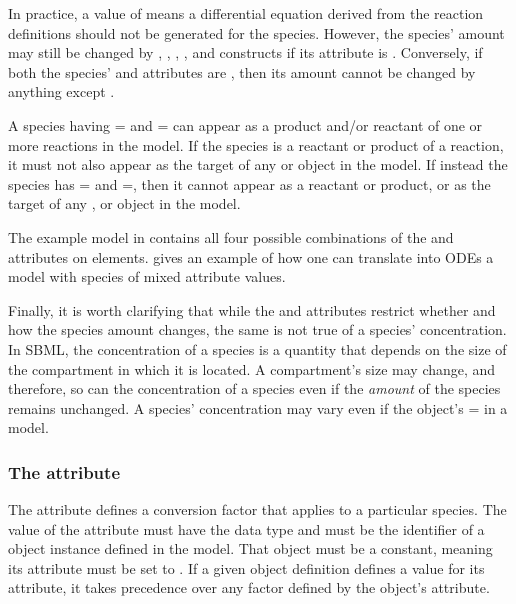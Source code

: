 In practice, a  value of  means
a differential equation derived from the reaction definitions
should not be generated for the species.  However, the species'
amount may still be changed by \AssignmentRule, \RateRule,
\AlgebraicRule, \Event, and \InitialAssignment constructs if its
 attribute is .  Conversely, if both
the species'  and 
attributes are , then its amount cannot be changed by
anything except \InitialAssignment.

A species having = and
= can appear as a product and/or
reactant of one or more reactions in the model.  If the species is
a reactant or product of a reaction, it must not also appear as
the target of any \AssignmentRule or \RateRule object in the
model.  If instead the species has
= and
=, then it cannot appear as a reactant
or product, or as the target of any \AssignmentRule, \RateRule or
\EventAssignment object in the model.

The example model in  contains
all four possible combinations of the 
and  attributes on  elements.
 gives an example of how one can translate
into ODEs a model with species of mixed
 attribute values.

Finally, it is worth clarifying that while the  and  attributes restrict whether and how the species amount changes, the same is not true of a species' concentration.  In SBML, the concentration of a species is a quantity that depends on the size of the compartment in which it is located.  A compartment's size may change, and therefore, so can the concentration of a species even if the \emph{amount} of the species remains unchanged.  A species' concentration may vary even if the \Species object's = in a model.


\subsubsection{The  attribute}
\label{sec:species-conversion}

The attribute  defines a conversion factor
that applies to a particular species.  The value of the attribute
must have the data type  and must be the
identifier of a \Parameter object instance defined in the model.
That \Parameter object must be a constant, meaning its
 attribute must be set to .  If a given
\Species object definition defines a value for its
 attribute, it takes precedence over any
factor defined by the \Model object's 
attribute.

